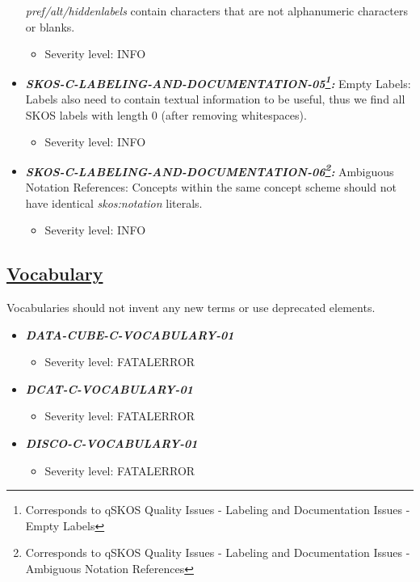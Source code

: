 \documentclass{llncs}
\begin{document}
\begin{itemize}
	\emph{pref/alt/hiddenlabels} contain characters that are not alphanumeric characters or blanks.
	\begin{itemize}
		\item Severity level: INFO
	\end{itemize}
	\item \textbf{{\em SKOS-C-LABELING-AND-DOCUMENTATION-05\footnote{Corresponds to qSKOS Quality Issues - Labeling and Documentation Issues - Empty Labels}:}}
	Empty Labels:
	Labels also need to contain textual information to be useful, thus we find all SKOS labels with length 0 (after removing whitespaces). 
	\begin{itemize}
		\item Severity level: INFO
	\end{itemize}
	\item \textbf{{\em SKOS-C-LABELING-AND-DOCUMENTATION-06\footnote{Corresponds to qSKOS Quality Issues - Labeling and Documentation Issues - Ambiguous Notation References}:}}
	Ambiguous Notation References:
	Concepts within the same concept scheme should not have identical \emph{skos:notation} literals. 
	\begin{itemize}
		\item Severity level: INFO
	\end{itemize}
\end{itemize}

\subsection{\underline{Vocabulary}}
Vocabularies should not invent any new terms or use deprecated elements. 

\begin{itemize}
	\item \textbf{\em DATA-CUBE-C-VOCABULARY-01} 
	\begin{itemize}
		\item Severity level: FATALERROR
	\end{itemize}
\end{itemize}

\begin{itemize}
	\item \textbf{\em DCAT-C-VOCABULARY-01} 
	\begin{itemize}
		\item Severity level: FATALERROR
	\end{itemize}
\end{itemize}

\begin{itemize}
	\item \textbf{\em DISCO-C-VOCABULARY-01} 
	\begin{itemize}
		\item Severity level: FATALERROR
	\end{itemize}
\end{itemize}
\end{document}
